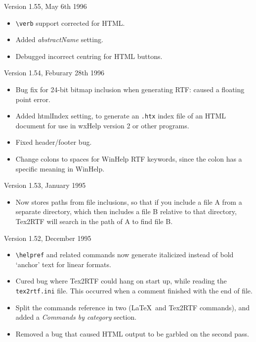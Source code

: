 Version 1.55, May 6th 1996

\begin{itemize}\itemsep=0pt
\item \verb$\verb$ support corrected for HTML.
\item Added {\it abstractName} setting.
\item Debugged incorrect centring for HTML buttons.
\end{itemize}

Version 1.54, Feburary 28th 1996

\begin{itemize}\itemsep=0pt
\item Bug fix for 24-bit bitmap inclusion when generating RTF:
caused a floating point error.
\item Added htmlIndex setting, to generate an {\tt .htx} index file of an HTML document for
use in wxHelp version 2 or other programs.
\item Fixed header/footer bug.
\item Change colons to spaces for WinHelp RTF keywords, since the colon has a specific meaning in WinHelp.
\end{itemize}

Version 1.53, January 1995

\begin{itemize}\itemsep=0pt
\item Now stores paths from file inclusions, so that if you include
a file A from a separate directory, which then includes a file B
relative to that directory, Tex2RTF will search in the path
of A to find file B.
\end{itemize}

Version 1.52, December 1995

\begin{itemize}\itemsep=0pt
\item \verb$\helpref$ and related commands now generate italicized instead
of bold `anchor' text for linear formats.
\item Cured bug where Tex2RTF could hang on start up, while reading
the {\tt tex2rtf.ini} file. This occurred when a comment finished with
the end of file.
\item Split the commands reference in two (\LaTeX\ and Tex2RTF commands),
and added a {\it Commands by category} section.
\item Removed a bug that caused HTML output to be garbled on the
second pass.
\end{itemize}

